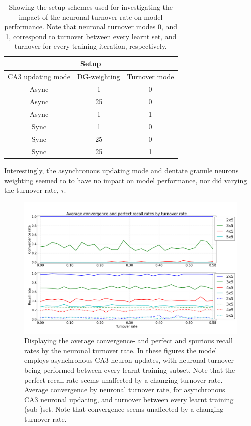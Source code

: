 \begin{table}[]
\centering
\caption{Showing the setup schemes used for investigating the impact of the neuronal turnover rate on model performance. Note that neuronal turnover modes 0, and 1, correspond to turnover between every learnt set, and turnover for every training iteration, respectively.}
\label{table:turnover_schemes}
\begin{tabular}{|c|c|c|}
\hline
\multicolumn{3}{|c|}{Setup}                               \\ \hline
CA3 updating mode & DG-weighting & Turnover mode        \\ \hline
Async             & 1            & 0                      \\ \hline
Async             & 25           & 0                      \\ \hline
Async             & 1            & 1                      \\ \hline
Sync              & 1            & 0                      \\ \hline
Sync              & 25           & 0                      \\ \hline
Sync              & 25           & 1                      \\ \hline
\end{tabular}
\end{table}

Interestingly, the asynchronous updating mode and dentate granule neurons weighting seemed to to have no impact on model performance, nor did varying the turnover rate, $\tau$.

\begin{figure}
    \centering
    \includegraphics[width=13cm]{fig/turnover_rates/async_tm0_dgw1}
    \caption{Displaying the average convergence- and perfect and spurious recall rates by the neuronal turnover rate. In these figures the model employs asynchronous CA3 neuron-updates, with neuronal turnover being performed between every learnt training subset. Note that the perfect recall rate seems unaffected by a changing turnover rate.
    Average convergence by neuronal turnover rate, for asynchronous CA3 neuronal updating, and turnover between every learnt training (sub-)set. Note that convergence seems unaffected by a changing turnover rate.}
    \label{fig:async_tm0_dgw1}
\end{figure}

